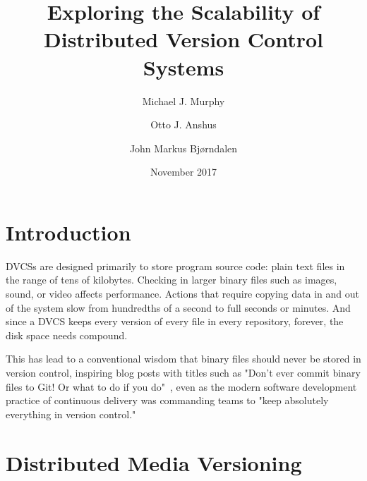 \documentclass[
    usenglish,
]{nik}
\title{Exploring the Scalability of Distributed Version Control Systems}
\author{Michael J. Murphy \and Otto J. Anshus \and John Markus Bjørndalen}
\date{November 2017}
\begin{document}
\maketitle

\begin{abstract}

\end{abstract}

\section{Introduction}





\Glspl{DVCS} are designed primarily to store program source code: plain text files in the range of tens of kilobytes.
Checking in larger binary files such as images, sound, or video affects performance.
Actions that require copying data in and out of the system slow from hundredths of a second to full seconds or minutes.
And since a \gls{DVCS} keeps every version of every file in every \gls{repository}, forever, the disk space needs compound.

This has lead to a conventional wisdom that binary files should never be stored in version control, inspiring blog posts with titles such as
"Don't ever commit binary files to Git! Or what to do if you do"~\cite{dont_ever_commit_binaries_to_version_control},
even as the modern software development practice of continuous delivery was commanding teams to "keep absolutely everything in version control."~\cite[p.33]{continuousdeliverybook}


\section{Distributed Media Versioning}
\end{document}
